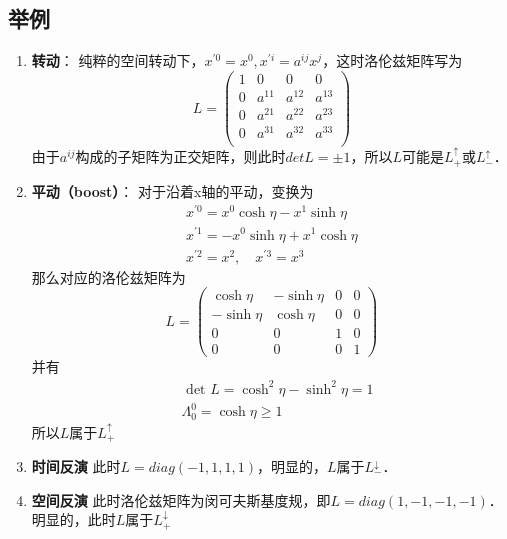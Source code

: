\subsection{举例}
\begin{enumerate}
\item \textbf{转动}： 纯粹的空间转动下，$x^{\prime 0}=x^{0}, x^{\prime i}=a^{i j} x^{j}$，这时洛伦兹矩阵写为
\begin{equation}       %
L=\left(                 %
  \begin{array}{cccc}   %
   1& 0 & 0 & 0\\  %
   0& a^{11} &  a^{12} &  a^{13}\\  %
   0& a^{21} &  a^{22} &  a^{23}\\  %
   0& a^{31} &  a^{32} &  a^{33}\\  %
  \end{array}
\right)                 %
\end{equation}
由于$a^{ij}$构成的子矩阵为正交矩阵，则此时$detL=\pm1$，所以$L$可能是$L_{+}^{\uparrow}$或$L_{-}^{\uparrow}$．
\item \textbf{平动（boost）}： 对于沿着x轴的平动，变换为
\begin{equation}\begin{array}{c}
x^{\prime 0}=x^{0} \cosh \eta-x^{1} \sinh \eta \\
x^{\prime 1}=-x^{0} \sinh \eta+x^{1} \cosh \eta \\
x^{\prime 2}=x^{2}, \quad x^{\prime 3}=x^{3}
\end{array}\end{equation}
那么对应的洛伦兹矩阵为
\begin{equation}L=\left(\begin{array}{cccc}
\cosh \eta & -\sinh \eta & 0 & 0 \\
-\sinh \eta & \cosh \eta & 0 & 0 \\
0 & 0 & 1 & 0 \\
0 & 0 & 0 & 1
\end{array}\right)\end{equation}
并有
\begin{equation}\begin{aligned}
&\text { det } L=\cosh ^{2} \eta-\sinh ^{2} \eta=1\\
&\Lambda_{0}^{0}=\cosh \eta \geqslant 1
\end{aligned}\end{equation}
所以$L$属于$L_{+}^{\uparrow}$
\item \textbf{时间反演}
此时$L=diag(-1,1,1,1)$，明显的，$L$属于$L_{-}^{\downarrow}$．
\item \textbf{空间反演}
此时洛伦兹矩阵为闵可夫斯基度规，即$L=diag(1,-1,-1,-1)$．明显的，此时$L$属于$L_{+}^{\downarrow}$
\end{enumerate}
